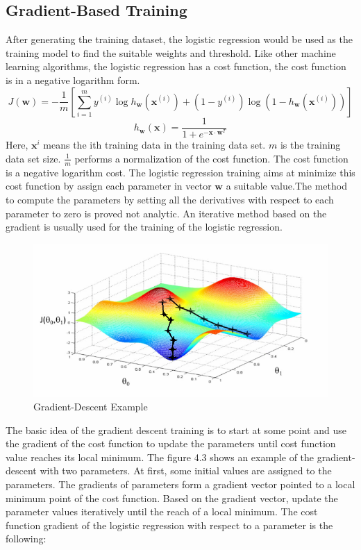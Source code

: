 \subsection{Gradient-Based Training}
After generating the training dataset, the logistic regression would be used as the training model to find the suitable weights and threshold. Like other machine learning algorithms, the logistic regression has a cost function, the cost function is in a negative logarithm form.
\begin{equation}
J(\textbf{w})= - \frac{1}{m}[\sum_{i=1}^m y^{(i)}\log h_\textbf{w}(\textbf{x}^{(i)}) +(1-y^{(i)})\log (1-h_\textbf{w}(\textbf{x}^{(i)}))]
\end{equation}
\begin{equation}
h_\textbf{w}(\textbf{x})= \frac{1}{1+e^{- \textbf{x} \cdot \textbf{w}^T}}
\end{equation}
Here, $\textbf{x}^{i}$ means the ith training data in the training data set. $m$ is the training data set size. $\frac{1}{m}$ performs a normalization of the cost function. The cost function is a negative logarithm cost. The logistic regression training aims at minimize this cost function by assign each parameter in vector $\textbf{w}$ a suitable value.The method to compute the parameters by setting all the derivatives with respect to each parameter to zero is proved not analytic. An iterative method based on the gradient is usually used for the training of the logistic regression.
\begin{center}
\begin{figure}
\centering
\includegraphics[scale=0.8]{gradient-descent.png}
\caption{Gradient-Descent Example\cite{gradient-descent} }
\end{figure}
\end{center}
The basic idea of the gradient descent training is to start at some point and use the gradient of the cost function to update the parameters until cost function value reaches its local minimum.  The figure 4.3 shows an example of the gradient-descent with two parameters. At first, some initial values are assigned to the parameters. The gradients of parameters form a gradient vector pointed to a local minimum point of the cost function. Based on the gradient vector, update the parameter values iteratively until the reach of a local minimum. The cost function gradient of the logistic regression with respect to a parameter is the following:
